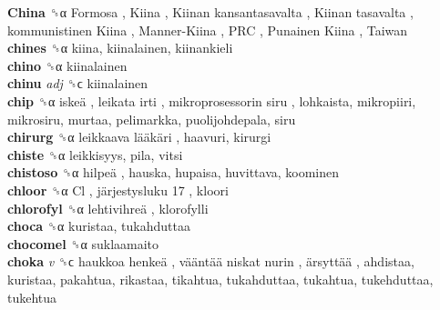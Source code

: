 \textbf{China} ␝α   Formosa ,  Kiina ,  Kiinan kansantasavalta ,  Kiinan tasavalta ,  kommunistinen Kiina ,  Manner-Kiina ,  PRC ,  Punainen Kiina ,  Taiwan   \\
\textbf{chines} ␝α  kiina, kiinalainen, kiinankieli  \\
\textbf{chino} ␝α  kiinalainen  \\
\textbf{chinu} \emph{adj}  ␝ϲ  kiinalainen  \\
\textbf{chip} ␝α   iskeä ,  leikata irti ,  mikroprosessorin siru , lohkaista, mikropiiri, mikrosiru, murtaa, pelimarkka, puolijohdepala, siru  \\
\textbf{chirurg} ␝α   leikkaava lääkäri , haavuri, kirurgi  \\
\textbf{chiste} ␝α  leikkisyys, pila, vitsi  \\
\textbf{chistoso} ␝α   hilpeä , hauska, hupaisa, huvittava, koominen  \\
\textbf{chloor} ␝α   Cl ,  järjestysluku 17 , kloori  \\
\textbf{chlorofyl} ␝α   lehtivihreä , klorofylli  \\
\textbf{choca} ␝α  kuristaa, tukahduttaa  \\
\textbf{chocomel} ␝α  suklaamaito  \\
\textbf{choka} \emph{v}  ␝ϲ   haukkoa henkeä ,  vääntää niskat nurin ,  ärsyttää , ahdistaa, kuristaa, pakahtua, rikastaa, tikahtua, tukahduttaa, tukahtua, tukehduttaa, tukehtua  \\
